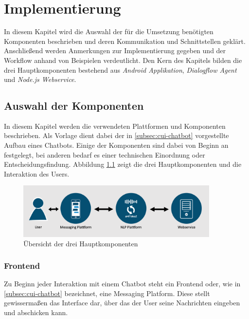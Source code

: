 \chapter{Implementierung}
\label{cha:implementierung}

In diesem Kapitel wird die Auswahl der für die Umsetzung benötigten Komponenten beschrieben und deren Kommunikation und Schnittstellen geklärt. Anschließend werden Anmerkungen zur Implementierung gegeben und der Workflow anhand von Beispielen verdeutlicht. Den Kern des Kapitels bilden die drei Hauptkomponenten bestehend aus \textit{Android Applikation}, \textit{Dialogflow Agent} und \textit{Node.js Webservice}.

\section{Auswahl der Komponenten}
\label{sec:auswahl-komponenten}

In diesem Kapitel werden die verwendeten Plattformen und Komponenten beschrieben. Als Vorlage dient dabei der in \ref{subsec:cui-chatbot} vorgestellte Aufbau eines Chatbots. Einige der Komponenten sind dabei von Beginn an festgelegt, bei anderen bedarf es einer technischen Einordnung oder Entscheidungsfindung. Abbildung \ref{fig:Komponenten-v1} zeigt die drei Hauptkomponenten und die Interaktion des Users.
\newline

\begin{figure}[htb]
    \centering
    \includegraphics[width=0.9\textwidth]{bilder/Komponenten-v1.png}
    \caption{Übersicht der drei Hauptkomponenten}
    \label{fig:Komponenten-v1}
\end{figure}

\subsection{Frontend}
\label{subsec:frontend}

Zu Beginn jeder Interaktion mit einem Chatbot steht ein Frontend oder, wie in \ref{subsec:cui-chatbot} bezeichnet, eine Messaging Platform. Diese stellt gewissermaßen das Interface dar, über das der User seine Nachrichten eingeben und abschicken kann. 

